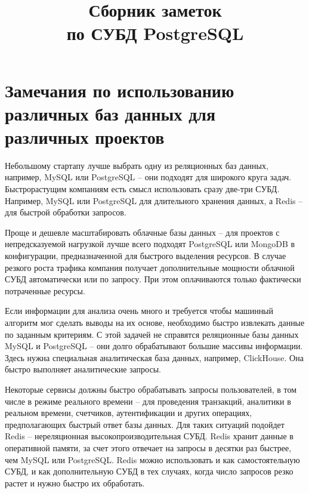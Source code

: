 \documentclass[%
	11pt,
	a4paper,
	utf8,
		]{article}
\begin{document}
\title{Сборник заметок\\по СУБД PostgreSQL}

\author{}

\date{}
\maketitle

\thispagestyle{fancy}

\tableofcontents

\section{Замечания по использованию различных баз данных для различных проектов}

Небольшому стартапу лучше выбрать одну из реляционных баз данных, например, MySQL или PostgreSQL -- они подходят для широкого круга задач. Быстрорастущим компаниям есть смысл использовать сразу две-три СУБД. Например, MySQL или PostgreSQL для длительного хранения данных, а Redis -- для быстрой обработки запросов.

Проще и дешевле масштабировать облачные базы данных -- для проектов с непредсказуемой нагрузкой лучше всего подходят PostgreSQL или MongoDB в конфигурации, предназначенной для быстрого выделения ресурсов. В случае резкого роста трафика компания получает дополнительные мощности облачной СУБД автоматически или по запросу. При этом оплачиваются только фактически потраченные ресурсы.

Если информации для анализа очень много и требуется чтобы машинный алгоритм мог сделать выводы на их основе, необходимо быстро извлекать данные по заданным критериям. С этой задачей не справятся реляционные базы данных MySQL и PostgreSQL -- они долго обрабатывают большие массивы информации. Здесь нужна специальная аналитическая база данных, например, ClickHouse. Она быстро выполняет аналитические запросы.

Некоторые сервисы должны быстро обрабатывать запросы пользователей, в том числе в режиме реального времени -- для проведения транзакций, аналитики в реальном времени, счетчиков, аутентификации и других операциях, предполагающих быстрый ответ базы данных. Для таких ситуаций подойдет Redis -- нереляционная высокопроизводительная СУБД. Redis хранит данные в оперативной памяти, за счет этого отвечает на запросы в десятки раз быстрее, чем MySQL или PostgreSQL. Redis можно использовать и как самостоятельную СУБД, и как дополнительную СУБД в тех случаях, когда число запросов резко растет и нужно быстро их обработать.
\end{document}
